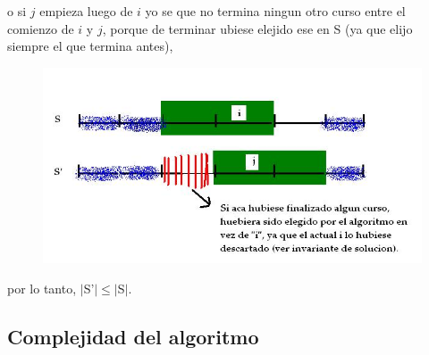 \begin{itemize}
\begin{itemize}
o si $j$ empieza luego de $i$ yo se que no termina ningun otro curso entre el comienzo de $i$ y $j$, porque de terminar ubiese elejido ese en S  (ya que elijo siempre el que termina antes), 

\begin{figure}[H] %
\begin{center}
\includegraphics[width=322pt]{../imgs/demo22.jpg}
\end{center}
\end{figure}

\end{itemize}

por lo tanto, $|$S'$| \leq |$S$|$. 


\subsection{Complejidad del algoritmo}


\end{itemize}
